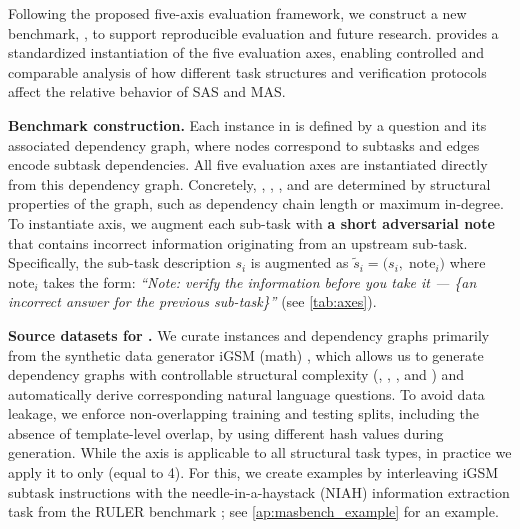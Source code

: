 Following the proposed five-axis evaluation framework, we construct a new benchmark,
\textbf{\ourbenchmark}, to support reproducible evaluation and future research. \ourbenchmark provides a standardized instantiation of the five evaluation axes, enabling controlled and comparable analysis of how different task structures and verification protocols affect the relative behavior of SAS and MAS.

\textbf{Benchmark construction.} Each instance in \ourbenchmark is defined by a question and its associated dependency graph, where nodes correspond to subtasks and edges encode subtask dependencies. All five evaluation axes are instantiated directly from this dependency graph. Concretely, \depth, \horizon, \breadth, and \myparallel are determined by structural properties of the graph, such as dependency chain length or maximum in-degree. To instantiate \robustness axis, we augment each sub-task with \textbf{a short adversarial note} that contains incorrect information originating from an upstream sub-task. Specifically, the sub-task description $s_i$ is augmented as $\tilde{s}_i = \big(s_i,\; \text{note}_i\big)$ where $\text{note}_i$ takes the form: \textit{``Note: verify the information before you take it --- \{an incorrect answer for the previous sub-task\}''} (see \cref{tab:axes}).




\textbf{Source datasets for \ourbenchmark.} 
We curate instances and dependency graphs primarily from the synthetic data generator iGSM (math) \cite{YXLA2024-gsm2}, which allows us to generate dependency graphs with controllable structural complexity (\depth, \horizon, \breadth, and \myparallel) and automatically derive corresponding natural language questions. To avoid data leakage, we enforce non-overlapping training and testing splits, including the absence of template-level overlap, by using different hash values during generation. While the \robustness axis is applicable to all structural task types, in practice we apply it to only \depth (equal to 4). For this, we create examples by interleaving iGSM subtask instructions with the needle-in-a-haystack (NIAH) information extraction task from the RULER benchmark  \citep{hsieh2024ruler}; {see \cref{ap:masbench_example} for an example}.  

